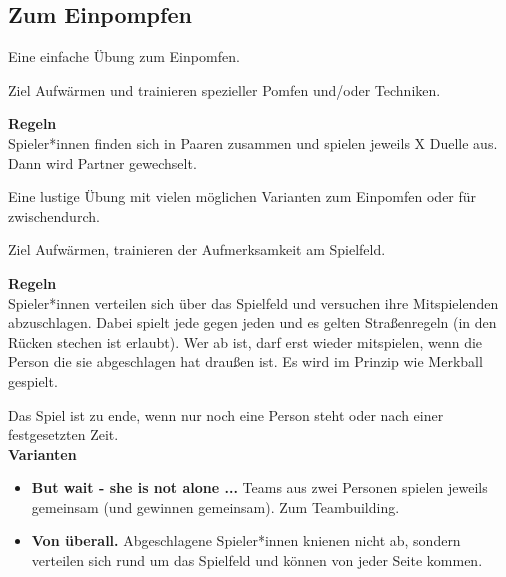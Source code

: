 \subsection*{\centering \LARGE Zum Einpompfen}


Eine einfache Übung zum Einpomfen. 

\begin{bclogo}[logo=\bcoutil]{Ziel}
Aufwärmen und trainieren spezieller Pomfen und/oder Techniken.
\end{bclogo}

\textbf{\large Regeln}\\
Spieler*innen finden sich in Paaren zusammen und spielen jeweils X Duelle aus. Dann wird Partner gewechselt. 



Eine lustige Übung mit vielen möglichen Varianten zum Einpomfen oder für zwischendurch.

\begin{bclogo}[logo=\bcoutil]{Ziel}
Aufwärmen, trainieren der Aufmerksamkeit am Spielfeld.
\end{bclogo}

\textbf{\large Regeln}\\
Spieler*innen verteilen sich über das Spielfeld und versuchen ihre Mitspielenden abzuschlagen. Dabei spielt jede gegen jeden und es gelten Straßenregeln (in den Rücken stechen ist erlaubt). Wer ab ist, darf erst wieder mitspielen, wenn die Person die sie abgeschlagen hat draußen ist. Es wird im Prinzip wie Merkball gespielt.

Das Spiel ist zu ende, wenn nur noch eine Person steht oder nach einer festgesetzten Zeit. \\\newline
\textbf{\large Varianten}
\begin{itemize}
    \item \textbf{But wait - she is not alone ...} Teams aus zwei Personen spielen jeweils gemeinsam (und gewinnen gemeinsam). Zum Teambuilding. 
    \item \textbf{Von überall.} Abgeschlagene Spieler*innen knienen nicht ab, sondern verteilen sich rund um das Spielfeld und können von jeder Seite kommen.
\end{itemize}

\newpage

